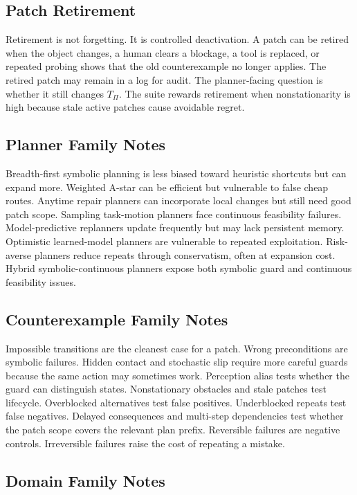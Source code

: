 \documentclass{article}
\newcommand{\patched}{T_{\Pi}}
\begin{document}
\subsection{Patch Retirement}

Retirement is not forgetting. It is controlled deactivation. A patch can be
retired when the object changes, a human clears a blockage, a tool is replaced,
or repeated probing shows that the old counterexample no longer applies. The
retired patch may remain in a log for audit. The planner-facing question is
whether it still changes $\patched$. The suite rewards retirement when
nonstationarity is high because stale active patches cause avoidable regret.

\subsection{Planner Family Notes}

Breadth-first symbolic planning is less biased toward heuristic shortcuts but
can expand more. Weighted A-star can be efficient but vulnerable to false cheap
routes. Anytime repair planners can incorporate local changes but still need
good patch scope. Sampling task-motion planners face continuous feasibility
failures. Model-predictive replanners update frequently but may lack persistent
memory. Optimistic learned-model planners are vulnerable to repeated exploitation.
Risk-averse planners reduce repeats through conservatism, often at expansion
cost. Hybrid symbolic-continuous planners expose both symbolic guard and
continuous feasibility issues.

\subsection{Counterexample Family Notes}

Impossible transitions are the cleanest case for a patch. Wrong preconditions
are symbolic failures. Hidden contact and stochastic slip require more careful
guards because the same action may sometimes work. Perception alias tests
whether the guard can distinguish states. Nonstationary obstacles and stale
patches test lifecycle. Overblocked alternatives test false positives.
Underblocked repeats test false negatives. Delayed consequences and multi-step
dependencies test whether the patch scope covers the relevant plan prefix.
Reversible failures are negative controls. Irreversible failures raise the cost
of repeating a mistake.

\subsection{Domain Family Notes}
\end{document}
